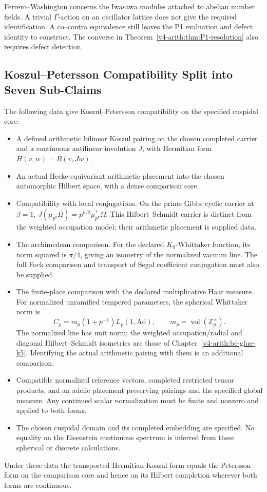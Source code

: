 Ferrero--Washington concerns the Iwasawa modules attached to abelian
number fields. A trivial \(\Gamma\)-action on an oscillator lattice
does not give the required identification. A co--contra equivalence still leaves the P1 evaluation and defect
identity to construct. The converse in
Theorem~\ref{v4-arith:thm:P1-resolution} also requires defect detection.

\subsection{Koszul--Petersson Compatibility Split into Seven Sub-Claims}

\begin{theorem}
\label{v4-arith:sw:thm:KP-split}
The following data give Koszul--Petersson compatibility on the
specified cuspidal core:
\begin{itemize}
\item[(K1)] A defined arithmetic bilinear Koszul pairing on the
chosen completed carrier and a continuous antilinear involution
\(J\), with Hermitian form \(H(v,w)=B(v,Jw)\).
\item[(K2)] An actual Hecke-equivariant arithmetic placement into
the chosen automorphic Hilbert space, with a dense comparison core.
\item[(K3)] Compatibility with local conjugations. On the prime
Gibbs cyclic carrier at \(\beta=1\),
\(J(\mu_{p^k}\Omega)=p^{k/2}\mu_{p^k}^*\Omega\).
This Hilbert--Schmidt carrier is distinct from the weighted
occupation model; their arithmetic placement is supplied data.
\item[(K4)] The archimedean comparison. For the declared
\(K_0\)-Whittaker function, its norm squared is \(\pi/4\), giving
an isometry of the normalized vacuum line. The full Fock comparison
and transport of Segal coefficient conjugation must also be supplied.
\item[(K5)] The finite-place comparison with the declared
multiplicative Haar measure. For normalized unramified tempered
parameters, the spherical Whittaker norm is
\[
 C_p=m_p(1+p^{-1})L_p(1,\mathrm{Ad}),
 \qquad m_p=\operatorname{vol}(\mathbb Z_p^\times).
\]
The normalized line has unit norm; the weighted occupation/radial
and diagonal Hilbert--Schmidt isometries are those of
Chapter~\ref{v4-arith:bc-glue-k5}. Identifying the actual arithmetic
pairing with them is an additional comparison.
\item[(K6)] Compatible normalized reference vectors, completed
restricted tensor products, and an adelic placement preserving
pairings and the specified global measure. Any continued scalar
normalization must be finite and nonzero and applied to both forms.
\item[(K7)] The chosen cuspidal domain and its completed embedding
are specified. No equality on the Eisenstein continuous spectrum is
inferred from these spherical or discrete calculations.
\end{itemize}
Under these data the transported Hermitian Koszul form equals the
Petersson form on the comparison core and hence on its Hilbert
completion wherever both forms are continuous.
\end{theorem}
